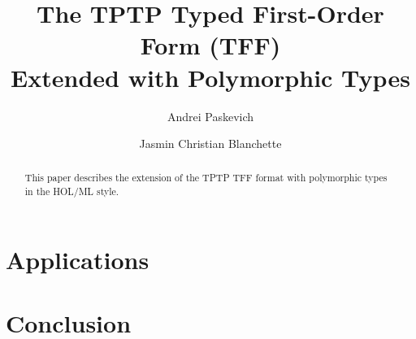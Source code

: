 \documentclass[draft,a4paper]{llncs}
\begin{document}
\title{
The TPTP Typed First-Order Form (TFF) \\ Extended with Polymorphic Types}

\author{
Andrei Paskevich \and Jasmin Christian Blanchette
}


\maketitle

\begin{abstract}
This paper describes the extension of the TPTP TFF format with polymorphic
types in the HOL/ML style.
\end{abstract}





\section{Applications}



\section{Conclusion}



\end{document}
